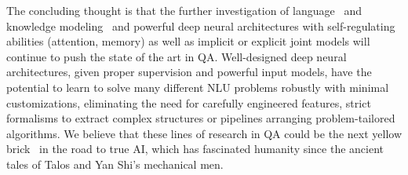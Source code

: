 The concluding thought is that the further investigation of language~\cite{mikolov1,mikolov2,glove,sensembed} and knowledge modeling~\cite{tatec,transe,riedel2013,ntn,trescal} and powerful deep neural architectures with self-regulating abilities (attention, memory) as well as implicit or explicit joint models will continue to push the state of the art in QA.
Well-designed deep neural architectures, given proper supervision and powerful input models, have the potential to learn to solve many different NLU problems robustly with minimal customizations, eliminating the need for carefully engineered features, strict formalisms to extract complex structures or pipelines arranging problem-tailored algorithms.
We believe that these lines of research in QA could be the next yellow brick~\cite{yellowbrick} in the road to true AI, which has fascinated humanity since the ancient tales of Talos and Yan Shi's mechanical men.


